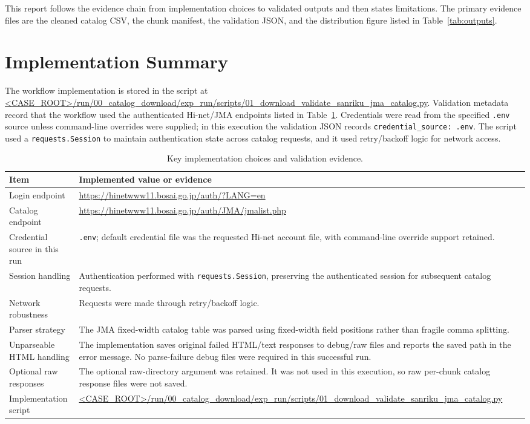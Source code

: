 \documentclass[11pt]{article}
\newcommand{\scriptpathurl}{\url{<CASE_ROOT>/run/00_catalog_download/exp_run/scripts/01_download_validate_sanriku_jma_catalog.py}}
\begin{document}
This report follows the evidence chain from implementation choices to validated outputs and then states limitations. The primary evidence files are the cleaned catalog CSV, the chunk manifest, the validation JSON, and the distribution figure listed in Table~\ref{tab:outputs}.

\section{Implementation Summary}

The workflow implementation is stored in the script at \scriptpathurl. Validation metadata record that the workflow used the authenticated Hi-net/JMA endpoints listed in Table~\ref{tab:method}. Credentials were read from the specified \texttt{.env} source unless command-line overrides were supplied; in this execution the validation JSON records \texttt{credential\_source: .env}. The script used a \texttt{requests.Session} to maintain authentication state across catalog requests, and it used retry/backoff logic for network access.

\begin{table}[H]
\centering
\caption{Key implementation choices and validation evidence.}
\label{tab:method}
\begin{tabularx}{\textwidth}{>{\raggedright\arraybackslash}p{}>{\raggedright\arraybackslash}X}
\toprule
Item & Implemented value or evidence \\
\midrule
Login endpoint & \url{https://hinetwww11.bosai.go.jp/auth/?LANG=en} \\
Catalog endpoint & \url{https://hinetwww11.bosai.go.jp/auth/JMA/jmalist.php} \\
Credential source in this run & \texttt{.env}; default credential file was the requested Hi-net account file, with command-line override support retained. \\
Session handling & Authentication performed with \texttt{requests.Session}, preserving the authenticated session for subsequent catalog requests. \\
Network robustness & Requests were made through retry/backoff logic. \\
Parser strategy & The JMA fixed-width catalog table was parsed using fixed-width field positions rather than fragile comma splitting. \\
Unparseable HTML handling & The implementation saves original failed HTML/text responses to debug/raw files and reports the saved path in the error message. No parse-failure debug files were required in this successful run. \\
Optional raw responses & The optional raw-directory argument was retained. It was not used in this execution, so raw per-chunk catalog response files were not saved. \\
Implementation script & \scriptpathurl \\
\bottomrule
\end{tabularx}
\end{table}
\end{document}
